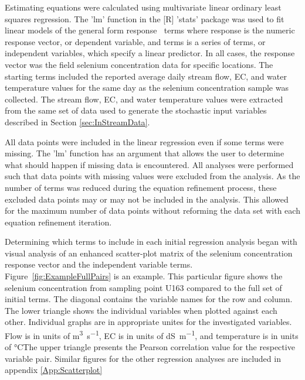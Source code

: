 \begin{linenumbers}
Estimating equations were calculated using multivariate linear ordinary least squares regression.  The 'lm' function in the [R] 'stats' package was used to fit linear models of the general form response $~$ terms where response is the numeric response vector, or dependent variable, and terms is a series of terms, or independent variables, which specify a linear predictor.  In all cases, the response vector was the field selenium concentration data for specific locations.  The starting terms included the reported average daily stream flow, EC, and water temperature values for the same day as the selenium concentration sample was collected.  The stream flow, EC, and water temperature values were extracted from the same set of data used to generate the stochastic input variables described in Section \ref{sec:InStreamData}.  

All data points were included in the linear regression even if some terms were missing.  The 'lm' function has an argument that allows the user to determine what should happen if missing data is encountered.  All analyses were performed such that data points with missing values were excluded from the analysis.  As the number of terms was reduced during the equation refinement process, these excluded data points may or may not be included in the analysis.  This allowed for the maximum number of data points without reforming the data set with each equation refinement iteration.

Determining which terms to include in each initial regression analysis began with visual analysis of an enhanced scatter-plot matrix of the selenium concentration response vector and the independent variable terms.  Figure~\ref{fig:ExampleFullPairs} is an example.  This particular figure shows the selenium concentration from sampling point U163 compared to the full set of initial terms.  The diagonal contains the variable names for the row and column.  The lower triangle shows the individual variables when plotted against each other.  Individual graphs are in appropriate unites for the investigated variables.  Flow is in units of \si{\cubic\meter\per\second}, EC is in units of \si{\deci\siemens\per\meter}, and temperature is in units of \si{\degreeCelsius}The upper triangle presents the Pearson correlation value for the respective variable pair.  Similar figures for the other regression analyses are included in appendix \ref{App:Scatterplot}


\end{linenumbers}

